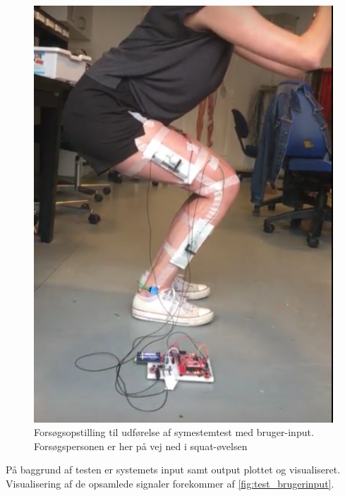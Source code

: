 \begin{figure}[H]
\centering
\includegraphics[width=1\textwidth]{figures/test_squat}
\caption{Forsøgsopstilling til udførelse af symestemtest med bruger-input. Forsøgspersonen er her på vej ned i squat-øvelsen}
\label{fig:test_squat}
\end{figure}

\noindent
På baggrund af testen er systemets input samt output plottet og visualiseret. Visualisering af de opsamlede signaler forekommer af \autoref{fig:test_brugerinput}. 

